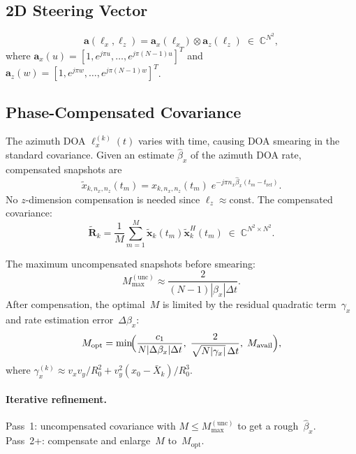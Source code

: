 \documentclass[11pt,a4paper]{article}
\newcommand{\C}{\mathbb{C}}
\begin{document}
\subsection{2D Steering Vector}

\begin{equation}
  \mathbf{a}(\ell_x,\ell_z)=\mathbf{a}_x(\ell_x)\otimes
  \mathbf{a}_z(\ell_z)\;\in\;\C^{N^2},
  \label{eq:steering}
\end{equation}
where
$\mathbf{a}_x(u)=[1,e^{j\pi u},\ldots,e^{j\pi(N-1)u}]^T$ and
$\mathbf{a}_z(w)=[1,e^{j\pi w},\ldots,e^{j\pi(N-1)w}]^T$.

\subsection{Phase-Compensated Covariance}
\label{sec:phase_comp}

The azimuth DOA $\ell_x^{(k)}(t)$ varies with time, causing DOA
smearing in the standard covariance.  Given an estimate
$\hat{\beta}_x$ of the azimuth DOA rate, compensated snapshots are
\begin{equation}
  \tilde{x}_{k,n_x,n_z}(t_m) = x_{k,n_x,n_z}(t_m)\;
  e^{-j\pi n_x\hat{\beta}_x(t_m-t_{\mathrm{ref}})}.
  \label{eq:comp}
\end{equation}
No $z$-dimension compensation is needed since
$\ell_z\approx\text{const}$.  The compensated covariance:
\begin{equation}
  \tilde{\mathbf{R}}_k
  =\frac{1}{M}\sum_{m=1}^{M}
  \tilde{\mathbf{x}}_k(t_m)\tilde{\mathbf{x}}_k^H(t_m)
  \;\in\;\C^{N^2\times N^2}.
  \label{eq:cov}
\end{equation}

The maximum uncompensated snapshots before smearing:
\begin{equation}
  M_{\max}^{(\mathrm{unc})}
  \approx\frac{2}{(N{-}1)|\beta_x|\Delta t}.
  \label{eq:Mmax}
\end{equation}
After compensation, the optimal~$M$ is limited by the residual
quadratic term~$\gamma_x$ and rate estimation error~$\Delta\beta_x$:
\begin{equation}
  M_{\mathrm{opt}}=\min\!\Bigl(
  \frac{c_1}{N|\Delta\beta_x|\Delta t},\;
  \frac{2}{\sqrt{N|\gamma_x|}\,\Delta t},\;
  M_{\mathrm{avail}}\Bigr),
  \label{eq:Mopt}
\end{equation}
where
$\gamma_x^{(k)}\approx v_xv_y/R_0^2+v_y^2(x_0{-}\bar{X}_k)/R_0^3$.

\paragraph{Iterative refinement.}
Pass~1: uncompensated covariance with $M\le M_{\max}^{(\mathrm{unc})}$
to get a rough~$\hat{\beta}_x$.
Pass~2+: compensate and enlarge~$M$ to~$M_{\mathrm{opt}}$.
\end{document}
